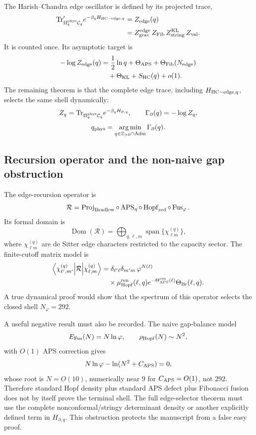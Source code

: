 \documentclass[aps,prd,reprint,nofootinbib,superscriptaddress,floatfix]{revtex4-2}
\numberwithin{equation}{section}
\theoremstyle{definition}
\theoremstyle{plain}
\begin{document}
The Harish--Chandra edge oscillator is defined by its projected trace,
\[
\begin{aligned}
{\rm Tr}'_{\Pi_q^{\rm phys}\mathcal C_q}
e^{-\beta_q H_{{\rm HC-edge},q}}
&= Z_{\rm edge}(q)\\
&=Z_{\rm grav}^{\rm edge}\,
Z_{\rm Fib}\,
Z_{\rm string}^{\rm KL}\,
Z_{\rm val}.
\end{aligned}
\]
It is counted once.  Its asymptotic target is
\[
\begin{aligned}
-\log Z_{\rm edge}(q)
&=
\frac12\ln q
+\Theta_{\rm APS}
+\Theta_{\rm Fib}(N_{\rm edge})\\
&\quad
+\Theta_{\rm KL}
+S_{\rm HC}(q)
+o(1).
\end{aligned}
\]
The remaining theorem is that the complete edge trace, including
\(H_{{\rm HC-edge},q}\), selects the same shell dynamically:
\[
Z_q
=
{\rm Tr}_{\Pi_q^{\rm phys}\mathcal C_q}
e^{-\beta_qH_{\partial,q}},
\qquad
\Gamma_\partial(q)=-\log Z_q,
\]
\[
q_{\rm phys}
=
\operatorname*{arg\,min}_{q\in\mathbb Z_{>0}\cap{\rm Adm}}
\Gamma_\partial(q).
\]

\subsection{Recursion operator and the non-naive gap obstruction}

The edge-recursion operator is
\[
\mathcal R
=
\operatorname{Proj}_{\rm Bradlow}
\circ
\operatorname{APS}_{\eta}
\circ
\operatorname{Hopf}_{\rm red}
\circ
\operatorname{Fus}_{\varphi}.
\]
Its formal domain is
\[
\operatorname{Dom}(\mathcal R)
=
\bigoplus_{q,\ell,m}
\operatorname{span}\{\chi_{\ell m}^{(q)}\},
\]
where \(\chi_{\ell m}^{(q)}\) are de Sitter edge characters restricted to the
capacity sector.  The finite-cutoff matrix model is
\[
\begin{aligned}
\left\langle
\chi_{\ell',m'}^{(q)}
\middle|
\mathcal R
\middle|
\chi_{\ell,m}^{(q)}
\right\rangle
&=
\delta_{\ell'\ell}\delta_{m'm}\,
\varphi^{N(\ell)}
\\
&\quad\times
\mu_{\rm Hopf}^{\rm ren}(\ell,q)
e^{-\Theta_{\rm APS}^{\rm ren}(\ell)}
\Theta_{\rm Br}(\ell,q).
\end{aligned}
\]
A true dynamical proof would show that the spectrum of this operator selects
the closed shell \(N_\varphi=292\).

A useful negative result must also be recorded.  The naive gap-balance model
\[
E_{\rm Fus}(N)=N\ln\varphi,\qquad
\rho_{\rm Hopf}(N)\sim N^2,
\]
with \(O(1)\) APS correction gives
\[
N\ln\varphi-\ln(N^2+C_{\rm APS})=0,
\]
whose root is \(N=O(10)\), numerically near \(9\) for \(C_{\rm APS}=O(1)\),
not \(292\).  Therefore standard Hopf density plus standard APS defect plus
Fibonacci fusion does not by itself prove the terminal shell.  The full
edge-selector theorem must use the complete nonconformal/stringy determinant
density or another explicitly defined term in \(H_{\partial,q}\).  This
obstruction protects the manuscript from a false easy proof.
\end{document}
